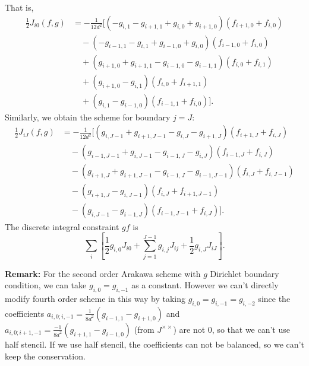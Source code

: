 That is,
\begin{equation}
	\begin{aligned}
		\frac{1}{2}J_{i0} (f,g) & = -\frac{1}{12d^2}[(-g_{i,1}-g_{i+1,1}+g_{i,0}+g_{i+1,0})(f_{i+1,0}+f_{i,0})\\
		& \quad - (-g_{i-1,1}-g_{i,1}+g_{i-1,0}+g_{i,0})(f_{i-1,0}+f_{i,0})\\
		& \quad + (g_{i+1,0}+g_{i+1,1}-g_{i-1,0}-g_{i-1,1})(f_{i,0}+f_{i,1})\\
		& \quad + (g_{i+1,0}-g_{i,1})(f_{i,0}+f_{i+1,1})\\
		& \quad + (g_{i,1}-g_{i-1,0})(f_{i-1,1}+f_{i,0})].
	\end{aligned}
\end{equation}
Similarly, we obtain the scheme for boundary $j=J$:
\begin{equation}
	\begin{aligned}
		\frac{1}{2}J_{iJ} (f,g) & = -\frac{1}{12d^2}[(g_{i,J-1}+g_{i+1,J-1}-g_{i,J}-g_{i+1,J})(f_{i+1,J}+f_{i,J})\\
		& \quad - (g_{i-1,J-1}+g_{i,J-1}-g_{i-1,J}-g_{i,J})(f_{i-1,J}+f_{i,J})\\
		& \quad - (g_{i+1,J}+g_{i+1,J-1}-g_{i-1,J}-g_{i-1,J-1})(f_{i,J}+f_{i,J-1})\\
		& \quad - (g_{i+1,J}-g_{i,J-1})(f_{i,J}+f_{i+1,J-1})\\
		& \quad - (g_{i,J-1}-g_{i-1,J})(f_{i-1,J-1}+f_{i,J})].
	\end{aligned}
\end{equation}
The discrete integral constraint $gf$ is $$\sum_{i}\left[ \frac{1}{2}g_{i,0}J_{i0}+\sum_{j=1}^{J-1} g_{i,j}J_{ij}+\frac{1}{2}g_{i,J}J_{iJ} \right].$$ %

\textbf{Remark:} For the second order Arakawa scheme with $g$ Dirichlet boundary condition, we can take $g_{i,0}=g_{i,-1}$ as a constant. However we can't directly modify fourth order scheme in this way by taking $g_{i,0}=g_{i,-1}=g_{i,-2}$ since the coefficients  $a_{i,0;i,-1}=\frac{1}{8d^2}(g_{i-1,1}-g_{i+1,0})$ and $a_{i,0;i+1,-1}=\frac{-1}{8d^2}(g_{i+1,1}-g_{i-1,0})$ (from $J^{\times \times}$) are not 0, so that we can't use half stencil. If we use half stencil, the coefficients can not be balanced, so we can't keep the conservation.

